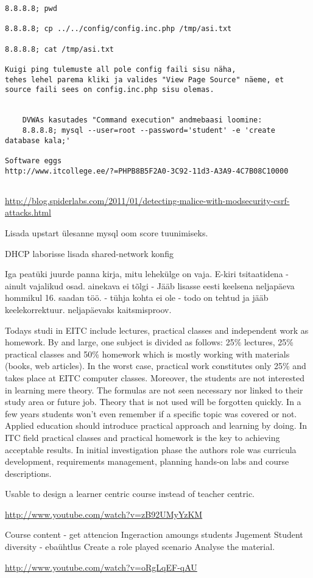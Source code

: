 \begin{verbatim}
8.8.8.8; pwd

8.8.8.8; cp ../../config/config.inc.php /tmp/asi.txt

8.8.8.8; cat /tmp/asi.txt

Kuigi ping tulemuste all pole config faili sisu näha, 
tehes lehel parema kliki ja valides "View Page Source" näeme, et source faili sees on config.inc.php sisu olemas.


    DVWAs kasutades "Command execution" andmebaasi loomine:
    8.8.8.8; mysql --user=root --password='student' -e 'create database kala;'

Software eggs
http://www.itcollege.ee/?=PHPB8B5F2A0-3C92-11d3-A3A9-4C7B08C10000
    

\end{verbatim}

\url{http://blog.spiderlabs.com/2011/01/detecting-malice-with-modsecurity-csrf-attacks.html}

Lisada upstart ülesanne mysql oom score tuunimiseks.


DHCP laborisse lisada shared-network konfig

Iga peatüki juurde panna kirja, mitu lehekülge on vaja.
E-kiri tsitaatidena - ainult vajalikud osad.
ainekava ei tõlgi - Jääb lisasse eesti keelsena
neljapäeva hommikul 16. saadan töö. - tühja kohta ei ole - todo on tehtud ja jääb keelekorrektuur.
neljapäevaks kaitsmisproov.

 Todays studi in \gls{EITC} include lectures, practical classes and independent work as homework. By and large, one subject is divided as follows: 25\% lectures, 25\% practical classes and 50\% homework which is mostly working with materials (books, web articles). In the worst case, practical work constitutes only 25\% and takes place at \gls{EITC} computer classes.
Moreover, the students are not interested in learning mere theory. The formulas are not seen necessary nor linked to their study area or future job. Theory that is not used will be forgotten quickly. In a few years students won't even remember if a specific topic was covered or not. Applied education should introduce practical approach and learning by doing. In ITC field practical classes and practical homework is the key to achieving acceptable results.
In initial investigation phase the authors role was curricula development, requirements management,  planning hands-on labs and course descriptions.

{\color{red} 
Usable to design a learner centric course instead of teacher centric. 

\url{http://www.youtube.com/watch?v=zB92UMyYzKM}

Course content - get attencion
Ingeraction amoungs students
Jugement 
Student diversity - ebaühtlus
Create a role played scenario
Analyse the material.

\url{http://www.youtube.com/watch?v=oRgLqEF-qAU}

}

